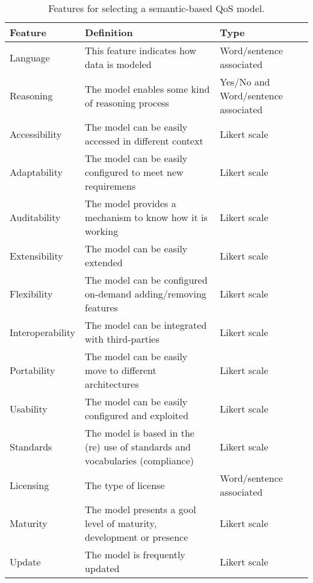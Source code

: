 \begin{table}[!ht]
\renewcommand{\arraystretch}{1.3}
\tiny
\begin{center}
\begin{tabular}[c]{|p{2.5cm}|p{5cm}|p{3cm}|} 
\hline
  \textbf{Feature} &  \textbf{Definition}  &  \textbf{Type} \\\hline
  Language & This feature indicates how data is modeled & Word/sentence associated \\ \hline
  Reasoning & The model enables some kind of reasoning process & Yes/No and Word/sentence associated  \\ \hline
  Accessibility & The model can be easily accessed in different context & Likert scale  \\ \hline
  Adaptability & The model can be easily configured to meet new requiremens & Likert scale  \\ \hline
  Auditability & The model provides a mechanism to know how it is working & Likert scale  \\ \hline
  Extensibility & The model can be easily extended & Likert scale  \\ \hline
  Flexibility & The model can be configured on-demand adding/removing features & Likert scale  \\ \hline  
  Interoperability & The model can be integrated with third-parties  & Likert scale  \\ \hline
  Portability & The model can be easily move to different architectures & Likert scale  \\ \hline
  Usability & The model can be easily configured and exploited & Likert scale  \\ \hline
  Standards & The model is based in the (re) use of standards and vocabularies (compliance) & Likert scale\ \\ \hline
  Licensing & The type of license & Word/sentence associated \\ \hline
  Maturity & The model presents a gool level of maturity, development or presence & Likert scale\\ \hline
  Update & The model is frequently updated & Likert scale\\ \hline
\hline
\end{tabular}
\caption{Features for selecting a semantic-based QoS model.}\label{features-qos-models}
  \end{center}
\end{table} 


